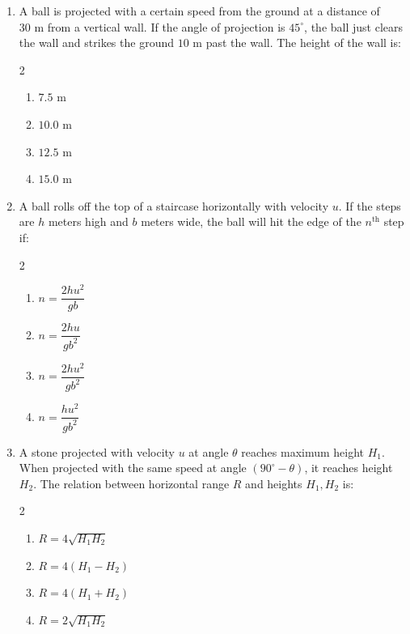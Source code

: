 \documentclass[11pt,a4paper]{article}
\begin{document}
\begin{enumerate}[label=\textbf{\textcolor{l2Amber}{Q\arabic*.}},leftmargin=24pt,itemsep=10pt,start=26]
  \item A ball is projected with a certain speed from the ground at a distance of $30\text{ m}$ from a vertical wall. If the angle of projection is $45^\circ$, the ball just clears the wall and strikes the ground $10\text{ m}$ past the wall. The height of the wall is:
  \begin{multicols}{2}
  \begin{enumerate}[label=\textbf{\textcolor{primaryDark}{(\Alph*)}},itemsep=2pt]
    \item $7.5\text{ m}$
    \item $10.0\text{ m}$
    \item $12.5\text{ m}$
    \item $15.0\text{ m}$
  \end{enumerate}
  \end{multicols}

  \item A ball rolls off the top of a staircase horizontally with velocity $u$. If the steps are $h$ meters high and $b$ meters wide, the ball will hit the edge of the $n^{\text{th}}$ step if:
  \begin{multicols}{2}
  \begin{enumerate}[label=\textbf{\textcolor{primaryDark}{(\Alph*)}},itemsep=2pt]
    \item $n = \dfrac{2hu^2}{gb}$
    \item $n = \dfrac{2hu}{gb^2}$
    \item $n = \dfrac{2hu^2}{gb^2}$
    \item $n = \dfrac{hu^2}{gb^2}$
  \end{enumerate}
  \end{multicols}

  \item A stone projected with velocity $u$ at angle $\theta$ reaches maximum height $H_1$. When projected with the same speed at angle $(90^\circ - \theta)$, it reaches height $H_2$. The relation between horizontal range $R$ and heights $H_1, H_2$ is:
  \begin{multicols}{2}
  \begin{enumerate}[label=\textbf{\textcolor{primaryDark}{(\Alph*)}},itemsep=2pt]
    \item $R = 4\sqrt{H_1 H_2}$
    \item $R = 4(H_1 - H_2)$
    \item $R = 4(H_1 + H_2)$
    \item $R = 2\sqrt{H_1 H_2}$
  \end{enumerate}
  \end{multicols}


\end{enumerate}
\end{document}
